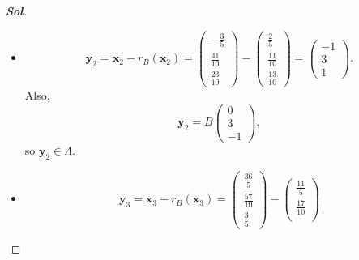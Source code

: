 \begin{enumerate}
\begin{proof}[\normalfont\color{magenta}\bfseries Sol]
\begin{itemize}
\[\begin{pmatrix}
			\frac{37}{10}\\[2pt]
			-\frac75
		\end{pmatrix}
		-
		\begin{pmatrix}
			\frac15\\[2pt]
			\frac7{10}\\[2pt]
			\frac35
		\end{pmatrix}
		=
		\begin{pmatrix}
			5\\[2pt]
			3\\[2pt]
			-2
		\end{pmatrix}.
		\]
		Also,
		\[
		\mathbf y_1
		=
		B
		\begin{pmatrix}
			3\\0\\-1
		\end{pmatrix},
		\]
		so \(\mathbf y_1\in\Lambda\).
		\item[($\mathbf x_2$)] \[
		\mathbf y_2
		=
		\mathbf x_2-r_B(\mathbf x_2)
		=
		\begin{pmatrix}
			-\frac35\\[2pt]
			\frac{41}{10}\\[2pt]
			\frac{23}{10}
		\end{pmatrix}
		-
		\begin{pmatrix}
			\frac25\\[2pt]
			\frac{11}{10}\\[2pt]
			\frac{13}{10}
		\end{pmatrix}
		=
		\begin{pmatrix}
			-1\\[2pt]
			3\\[2pt]
			1
		\end{pmatrix}.
		\]
		Also,
		\[
		\mathbf y_2
		=
		B
		\begin{pmatrix}
			0\\3\\-1
		\end{pmatrix},
		\]
		so \(\mathbf y_2\in\Lambda\).
		\item[($\mathbf x_3$)] \[
		\mathbf y_3
		=
		\mathbf x_3-r_B(\mathbf x_3)
		=
		\begin{pmatrix}
			\frac{36}{5}\\[2pt]
			\frac{57}{10}\\[2pt]
			\frac35
		\end{pmatrix}
		-
		\begin{pmatrix}
			\frac{11}{5}\\[2pt]
			\frac{17}{10}\\[2pt]

\end{pmatrix}\]
\end{itemize}
\end{proof}
\end{enumerate}
